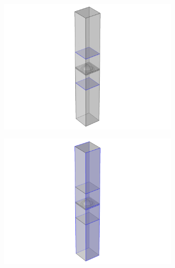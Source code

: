 \begin{figure}[htb]
    \begin{subfigure}{0.19\textwidth}
        \centering
        \includegraphics[width=\linewidth, trim=4.2cm 0 4.2cm 0, clip]{figures/ch4/implem/ewfd/ewfd_ports.png}
        \caption{}
        \label{fig:implementation_ewfd_ports}
    \end{subfigure}
    \begin{subfigure}{0.19\textwidth}
        \centering
        \includegraphics[width=\linewidth, trim=4.2cm 0 4.2cm 0, clip]{figures/ch4/implem/ewfd/ewfd_pc1.png}
        \caption{}
        \label{fig:implementation_ewfd_pc1}
    \end{subfigure}
    \begin{subfigure}{0.19\textwidth}

\end{subfigure}
\end{figure}

